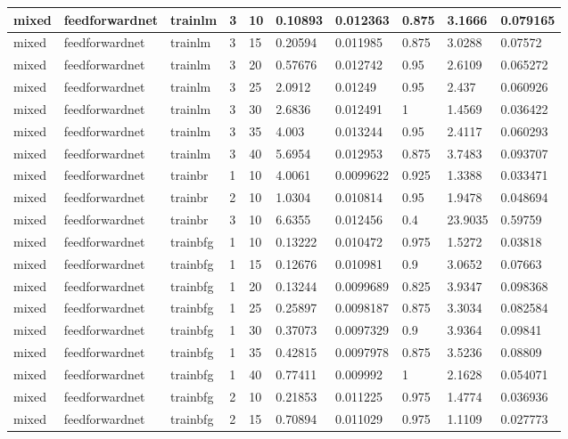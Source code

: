 \begin{longtable}{lllllllll}
mixed & feedforwardnet & trainlm & 3 & 10 & 0.10893 & 0.012363 & 0.875 & 3.1666 & 0.079165 \\ \hline 
mixed & feedforwardnet & trainlm & 3 & 15 & 0.20594 & 0.011985 & 0.875 & 3.0288 & 0.07572 \\ \hline 
mixed & feedforwardnet & trainlm & 3 & 20 & 0.57676 & 0.012742 & 0.95 & 2.6109 & 0.065272 \\ \hline 
mixed & feedforwardnet & trainlm & 3 & 25 & 2.0912 & 0.01249 & 0.95 & 2.437 & 0.060926 \\ \hline 
mixed & feedforwardnet & trainlm & 3 & 30 & 2.6836 & 0.012491 & 1 & 1.4569 & 0.036422 \\ \hline 
mixed & feedforwardnet & trainlm & 3 & 35 & 4.003 & 0.013244 & 0.95 & 2.4117 & 0.060293 \\ \hline 
mixed & feedforwardnet & trainlm & 3 & 40 & 5.6954 & 0.012953 & 0.875 & 3.7483 & 0.093707 \\ \hline 
mixed & feedforwardnet & trainbr & 1 & 10 & 4.0061 & 0.0099622 & 0.925 & 1.3388 & 0.033471 \\ \hline 
mixed & feedforwardnet & trainbr & 2 & 10 & 1.0304 & 0.010814 & 0.95 & 1.9478 & 0.048694 \\ \hline 
mixed & feedforwardnet & trainbr & 3 & 10 & 6.6355 & 0.012456 & 0.4 & 23.9035 & 0.59759 \\ \hline 
mixed & feedforwardnet & trainbfg & 1 & 10 & 0.13222 & 0.010472 & 0.975 & 1.5272 & 0.03818 \\ \hline 
mixed & feedforwardnet & trainbfg & 1 & 15 & 0.12676 & 0.010981 & 0.9 & 3.0652 & 0.07663 \\ \hline 
mixed & feedforwardnet & trainbfg & 1 & 20 & 0.13244 & 0.0099689 & 0.825 & 3.9347 & 0.098368 \\ \hline 
mixed & feedforwardnet & trainbfg & 1 & 25 & 0.25897 & 0.0098187 & 0.875 & 3.3034 & 0.082584 \\ \hline 
mixed & feedforwardnet & trainbfg & 1 & 30 & 0.37073 & 0.0097329 & 0.9 & 3.9364 & 0.09841 \\ \hline 
mixed & feedforwardnet & trainbfg & 1 & 35 & 0.42815 & 0.0097978 & 0.875 & 3.5236 & 0.08809 \\ \hline 
mixed & feedforwardnet & trainbfg & 1 & 40 & 0.77411 & 0.009992 & 1 & 2.1628 & 0.054071 \\ \hline 
mixed & feedforwardnet & trainbfg & 2 & 10 & 0.21853 & 0.011225 & 0.975 & 1.4774 & 0.036936 \\ \hline 
mixed & feedforwardnet & trainbfg & 2 & 15 & 0.70894 & 0.011029 & 0.975 & 1.1109 & 0.027773 \\ \hline 

\end{longtable}
